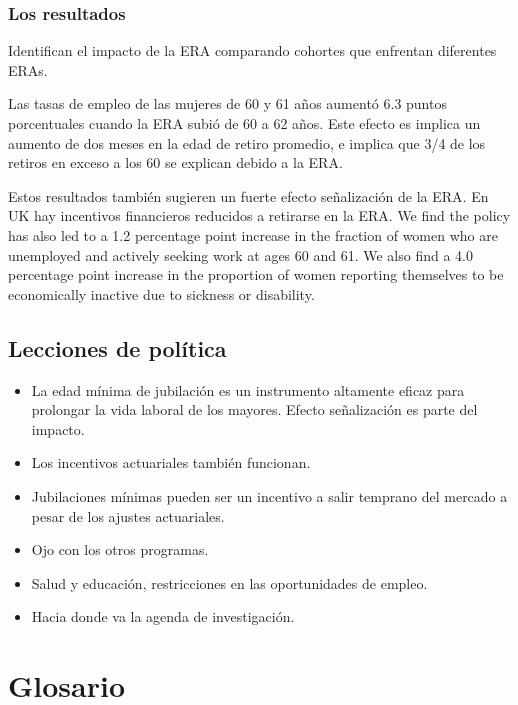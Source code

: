 \documentclass[]{article}
\providecommand{\tightlist}{%
  \setlength{\itemsep}{0pt}\setlength{\parskip}{0pt}}
\begin{document}
\hypertarget{los-resultados}{%
\subsubsection{Los resultados}\label{los-resultados}}

Identifican el impacto de la ERA comparando cohortes que enfrentan
diferentes ERAs.

Las tasas de empleo de las mujeres de 60 y 61 años aumentó 6.3 puntos
porcentuales cuando la ERA subió de 60 a 62 años. Este efecto es implica
un aumento de dos meses en la edad de retiro promedio, e implica que 3/4
de los retiros en exceso a los 60 se explican debido a la ERA.

Estos resultados también sugieren un fuerte efecto señalización de la
ERA. En UK hay incentivos financieros reducidos a retirarse en la ERA.
We find the policy has also led to a 1.2 percentage point increase in
the fraction of women who are unemployed and actively seeking work at
ages 60 and 61. We also find a 4.0 percentage point increase in the
proportion of women reporting themselves to be economically inactive due
to sickness or disability.

\hypertarget{lecciones-de-poluxedtica}{%
\subsection{Lecciones de política}\label{lecciones-de-poluxedtica}}

\begin{itemize}
\tightlist
\item
  La edad mínima de jubilación es un instrumento altamente eficaz para
  prolongar la vida laboral de los mayores. Efecto señalización es parte
  del impacto.
\item
  Los incentivos actuariales también funcionan.
\item
  Jubilaciones mínimas pueden ser un incentivo a salir temprano del
  mercado a pesar de los ajustes actuariales.
\item
  Ojo con los otros programas.
\item
  Salud y educación, restricciones en las oportunidades de empleo.
\item
  Hacia donde va la agenda de investigación.
\end{itemize}

\hypertarget{glosario}{%
\section{Glosario}\label{glosario}}
\end{document}
